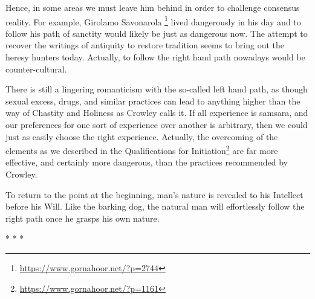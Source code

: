 Hence, in some areas we must leave him behind in order to challenge consensus reality. For example, Girolamo Savonarola \footnote{\url{https://www.gornahoor.net/?p=2744}} lived dangerously in his day and to follow his path of sanctity would likely be just as dangerous now. The attempt to recover the writings of antiquity to restore tradition seems to bring out the heresy hunters today. Actually, to follow the right hand path nowadays would be counter-cultural.

There is still a lingering romanticism with the so-called left hand path, as though sexual excess, drugs, and similar practices can lead to anything higher than the way of Chastity and Holiness as Crowley calls it. If all experience is samsara, and our preferences for one sort of experience over another is arbitrary, then we could just as easily choose the right experience. Actually, the overcoming of the elements as we described in the Qualifications for Initiation\footnote{\url{https://www.gornahoor.net/?p=1161}} are far more effective, and certainly more dangerous, than the practices recommended by Crowley. 

To return to the point at the beginning, man's nature is revealed to his Intellect before his Will. Like the barking dog, the natural man will effortlessly follow the right path once he grasps his own nature.




\begin{center}* * *\end{center}

